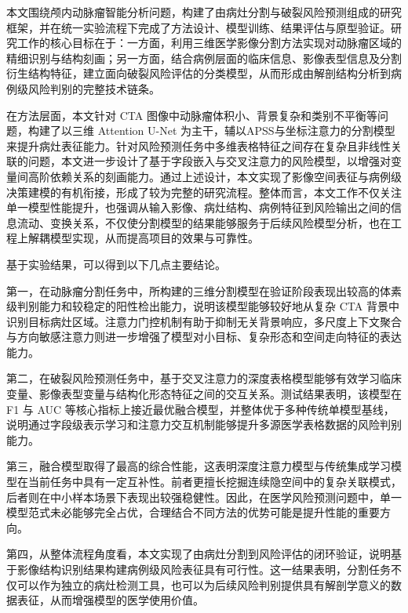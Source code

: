 
本文围绕颅内动脉瘤智能分析问题，构建了由病灶分割与破裂风险预测组成的研究框架，并在统一实验流程下完成了方法设计、模型训练、结果评估与原型验证。研究工作的核心目标在于：一方面，利用三维医学影像分割方法实现对动脉瘤区域的精细识别与结构刻画；另一方面，结合病例层面的临床信息、影像表型信息及分割衍生结构特征，建立面向破裂风险评估的分类模型，从而形成由解剖结构分析到病例级风险判别的完整技术链条。

在方法层面，本文针对 CTA 图像中动脉瘤体积小、背景复杂和类别不平衡等问题，构建了以三维 Attention U-Net 为主干，辅以APSS与坐标注意力的分割模型来提升病灶表征能力。针对风险预测任务中多维表格特征之间存在复杂且非线性关联的问题，本文进一步设计了基于字段嵌入与交叉注意力的风险模型，以增强对变量间高阶依赖关系的刻画能力。通过上述设计，本文实现了影像空间表征与病例级决策建模的有机衔接，形成了较为完整的研究流程。整体而言，本文工作不仅关注单一模型性能提升，也强调从输入影像、病灶结构、病例特征到风险输出之间的信息流动、变换关系，不仅使分割模型的结果能够服务于后续风险模型分析，也在工程上解耦模型实现，从而提高项目的效果与可靠性。


基于实验结果，可以得到以下几点主要结论。

第一，在动脉瘤分割任务中，所构建的三维分割模型在验证阶段表现出较高的体素级判别能力和较稳定的阳性检出能力，说明该模型能够较好地从复杂 CTA 背景中识别目标病灶区域。注意力门控机制有助于抑制无关背景响应，多尺度上下文聚合与方向敏感注意力则进一步增强了模型对小目标、复杂形态和空间走向特征的表达能力。

第二，在破裂风险预测任务中，基于交叉注意力的深度表格模型能够有效学习临床变量、影像表型变量与结构化形态特征之间的交互关系。测试结果表明，该模型在 F1 与 AUC 等核心指标上接近最优融合模型，并整体优于多种传统单模型基线，说明通过字段级表示学习和注意力交互机制能够提升多源医学表格数据的风险判别能力。

第三，融合模型取得了最高的综合性能，这表明深度注意力模型与传统集成学习模型在当前任务中具有一定互补性。前者更擅长挖掘连续隐空间中的复杂关联模式，后者则在中小样本场景下表现出较强稳健性。因此，在医学风险预测问题中，单一模型范式未必能够完全占优，合理结合不同方法的优势可能是提升性能的重要方向。

第四，从整体流程角度看，本文实现了由病灶分割到风险评估的闭环验证，说明基于影像结构识别结果构建病例级风险表征具有可行性。这一结果表明，分割任务不仅可以作为独立的病灶检测工具，也可以为后续风险判别提供具有解剖学意义的数据表征，从而增强模型的医学使用价值。

